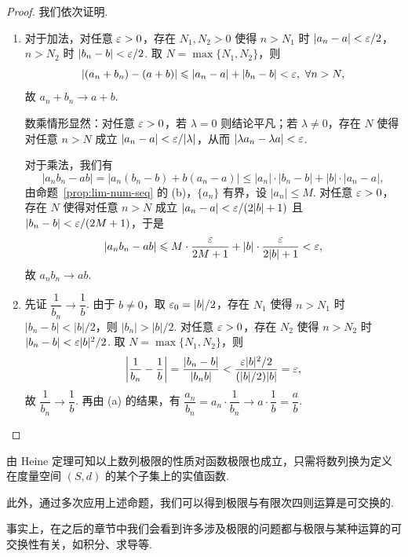\documentclass[../main.tex]{subfiles}
\begin{document}
\begin{proof}
    我们依次证明. 
    \begin{enumerate}[label=(\alph*)]
        \item 对于加法，对任意 $\varepsilon > 0$，存在 $N_1, N_2 > 0$ 使得 $n > N_1$ 时 $|a_n - a| < \varepsilon/2$，$n > N_2$ 时 $|b_n - b| < \varepsilon/2$.  取 $N = \max\{N_1, N_2\}$，则
        \[
        |(a_n + b_n) - (a + b)| \leqslant |a_n - a| + |b_n - b| < \varepsilon,\ \forall n > N, 
        \]
        故 $a_n + b_n \to a + b$.  

        数乘情形显然：对任意 $\varepsilon > 0$，若 $\lambda = 0$ 则结论平凡；若 $\lambda \neq 0$，存在 $N$ 使得对任意 $n > N$ 成立 $|a_n - a| < \varepsilon/|\lambda|$，从而 $|\lambda a_n - \lambda a| < \varepsilon$.  

        对于乘法，我们有
        \[
        |a_n b_n - ab| = |a_n(b_n - b) + b(a_n - a)| \leqslant |a_n| \cdot |b_n - b| + |b| \cdot |a_n - a|, 
        \]
        由命题~\ref{prop:lim-num-seq} 的 (b)，$\{a_n\}$ 有界，设 $|a_n| \leqslant M$.  对任意 $\varepsilon > 0$，存在 $N$ 使得对任意 $n > N$ 成立 $|a_n - a| < \varepsilon/(2|b| + 1)$ 且 $|b_n - b| < \varepsilon/(2M + 1)$，于是
        \[
        |a_n b_n - ab| \leqslant M \cdot \frac{\varepsilon}{2M + 1} + |b| \cdot \frac{\varepsilon}{2|b| + 1} < \varepsilon,
        \]
        故 $a_n b_n \to ab$.  

        \item 先证 $\dfrac{1}{b_n} \to \dfrac{1}{b}$. 由于 $b \neq 0$，取 $\varepsilon_0 = |b|/2$，存在 $N_1$ 使得 $n > N_1$ 时 $|b_n - b| < |b|/2$，则 $|b_n| > |b|/2$.  对任意 $\varepsilon > 0$，存在 $N_2$ 使得 $n > N_2$ 时 $|b_n - b| < \varepsilon |b|^2 / 2$.  取 $N = \max\{N_1, N_2\}$，则
        \[
        \left|\frac{1}{b_n} - \frac{1}{b}\right| = \frac{|b_n - b|}{|b_n b|} < \frac{\varepsilon |b|^2 / 2}{(|b|/2)|b|} = \varepsilon,
        \]
        故 $\dfrac{1}{b_n} \to \dfrac{1}{b}$.  再由 (a) 的结果，有 $\dfrac{a_n}{b_n} = a_n \cdot \dfrac{1}{b_n} \to a \cdot \dfrac{1}{b} = \dfrac{a}{b}$.  \qedhere
    \end{enumerate}
\end{proof}

\begin{remark}
    由 Heine 定理可知以上数列极限的性质对函数极限也成立，只需将数列换为定义在度量空间 $(S, d)$ 的某个子集上的实值函数. 

    此外，通过多次应用上述命题，我们可以得到极限与有限次四则运算是可交换的. 
\end{remark}

事实上，在之后的章节中我们会看到许多涉及极限的问题都与极限与某种运算的可交换性有关，如积分、求导等. 
\end{document}
